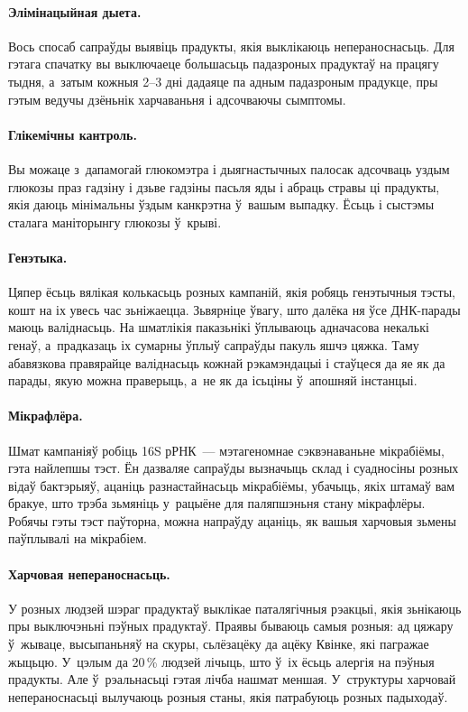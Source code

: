 \paragraph{Элімінацыйная дыета.}
Вось спосаб сапраўды выявіць прадукты, якія выклікаюць непераноснасьць. Для гэтага спачатку вы выключаеце большасьць падазроных прадуктаў на працягу тыдня, а~затым кожныя 2--3 дні дадаяце па адным падазроным прадукце, пры гэтым ведучы дзёньнік харчаваньня і адсочваючы сымптомы.

\paragraph{Глікемічны кантроль.}
Вы можаце з~дапамогай глюкомэтра і дыягнастычных палосак адсочваць уздым глюкозы праз гадзіну і дзьве гадзіны пасьля яды і абраць стравы ці прадукты, якія даюць мінімальны ўздым канкрэтна ў~вашым выпадку. Ёсьць і сыстэмы сталага маніторынгу глюкозы ў~крыві.

\paragraph{Генэтыка.}
Цяпер ёсьць вялікая колькасьць розных кампаній, якія робяць генэтычныя тэсты, кошт на іх увесь час зьніжаецца. Зьвярніце ўвагу, што далёка ня ўсе ДНК-парады маюць валіднасьць. На шматлікія паказьнікі ўплываюць адначасова некалькі генаў, а~прадказаць іх сумарны ўплыў сапраўды пакуль яшчэ цяжка. Таму абавязкова правярайце валіднасьць кожнай рэкамэндацыі і стаўцеся да яе як да парады, якую можна праверыць, а~не як да ісьціны ў~апошняй інстанцыі.

\paragraph{Мікрафлёра.}
Шмат кампаніяў робіць 16S рРНК~--- мэтагеномнае сэквэнаваньне мікрабіёмы, гэта найлепшы тэст. Ён дазваляе сапраўды вызначыць склад і суадносіны розных відаў бактэрыяў, ацаніць разнастайнасьць мікрабіёмы, убачыць, якіх штамаў вам бракуе, што трэба зьмяніць у~рацыёне для паляпшэньня стану мікрафлёры. Робячы гэты тэст паўторна, можна напраўду ацаніць, як вашыя харчовыя зьмены паўплывалі на мікрабіем.

\paragraph{Харчовая непераноснасьць.}
У розных людзей шэраг прадуктаў выклікае паталягічныя рэакцыі, якія зьнікаюць пры выключэньні пэўных прадуктаў. Праявы бываюць самыя розныя: ад цяжару ў~жываце, высыпаньняў на скуры, сьлёзацёку да ацёку Квінке, які пагражае жыцьцю. У~цэлым да 20\,\% людзей лічыць, што ў~іх ёсьць алергія на пэўныя прадукты. Але ў~рэальнасьці гэтая лічба нашмат меншая. У~структуры харчовай непераноснасьці вылучаюць розныя станы, якія патрабуюць розных падыходаў.

